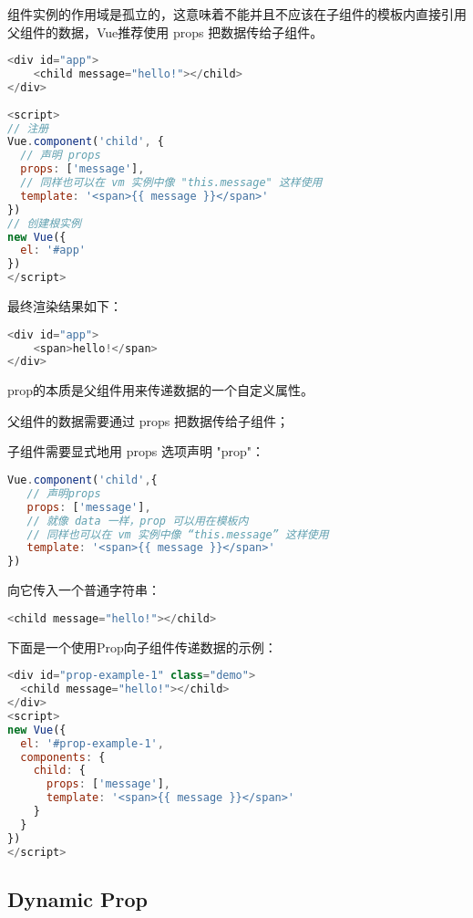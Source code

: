 组件实例的作用域是孤立的，这意味着不能并且不应该在子组件的模板内直接引用父组件的数据，Vue推荐使用 props 把数据传给子组件。


\begin{lstlisting}[language=JavaScript]
<div id="app">
    <child message="hello!"></child>
</div>
 
<script>
// 注册
Vue.component('child', {
  // 声明 props
  props: ['message'],
  // 同样也可以在 vm 实例中像 "this.message" 这样使用
  template: '<span>{{ message }}</span>'
})
// 创建根实例
new Vue({
  el: '#app'
})
</script>
\end{lstlisting}

最终渲染结果如下：


\begin{lstlisting}[language=JavaScript]
<div id="app">
    <span>hello!</span>
</div>
\end{lstlisting}

prop的本质是父组件用来传递数据的一个自定义属性。

\begin{compactitem}
\item 父组件的数据需要通过 props 把数据传给子组件；
\item 子组件需要显式地用 props 选项声明 "prop"：
\end{compactitem}


\begin{lstlisting}[language=JavaScript]
Vue.component('child',{
   // 声明props
   props: ['message'],
   // 就像 data 一样，prop 可以用在模板内
   // 同样也可以在 vm 实例中像 “this.message” 这样使用
   template: '<span>{{ message }}</span>'
})
\end{lstlisting}

向它传入一个普通字符串：

\begin{lstlisting}[language=JavaScript]
<child message="hello!"></child>
\end{lstlisting}

下面是一个使用Prop向子组件传递数据的示例：

\begin{lstlisting}[language=JavaScript]
<div id="prop-example-1" class="demo">
  <child message="hello!"></child>
</div>
<script>
new Vue({
  el: '#prop-example-1',
  components: {
    child: {
      props: ['message'],
      template: '<span>{{ message }}</span>'
    }
  }
})
</script>
\end{lstlisting}


\subsection{Dynamic Prop}



